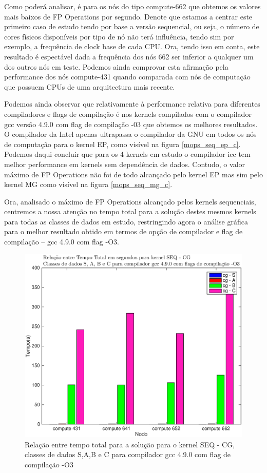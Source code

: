 \documentclass[conference,compsoc]{IEEEtran}
\begin{document}
Como poderá analisar, é para os nós do tipo compute-662 que obtemos os valores mais baixos de FP Operations por segundo. Denote que estamos a centrar este primeiro caso de estudo tendo por base a versão sequencial, ou seja, o número de cores físicos disponíveis por tipo de nó não terá influência, tendo sim por exemplo, a frequência de clock base de cada CPU. Ora, tendo isso em conta, este resultado é espectável dada a frequência dos nós 662 ser inferior a qualquer um dos outros nós em teste. Podemos ainda comprovar esta afirmação pela performance dos nós compute-431 quando comparada com nós de computação que possuem CPUs de uma arquitectura mais recente. \par 
Podemos ainda observar que relativamente à performance relativa para diferentes compiladores e flags de compilação é nos kernels compilados com o compilador gcc versão 4.9.0 com flag de compilação -03 que obtemos os melhores resultados. O compilador da Intel apenas ultrapassa o compilador da GNU em todos os nós de computação para o kernel EP, como visível na figura \ref{mops_seq_ep_c}. Podemos daqui concluir que para os 4 kernels em estudo o compilador icc tem melhor performance em kernels sem dependência de dados. Contudo, o valor máximo de FP Operations não foi de todo alcançado pelo kernel EP mas sim pelo kernel MG como visível na figura \ref{mops_seq_mg_c}.\par 
Ora, analisado o máximo de FP Operations alcançado pelos kernels sequenciais, centremos a nossa atenção no tempo total para a solução destes mesmos kernels para todas as classes de dados em estudo, restringindo agora o análise gráfica para o melhor resultado obtido em termos de opção de compilador e flag de compilação -- gcc 4.9.0 com flag -O3.

\begin{figure}[H]
\centering
\includegraphics[width=1.1\columnwidth]{EPS/SEQ/TEMPO_seq-cg.eps}
\caption{Relação entre tempo total para a solução para o kernel SEQ - CG, classes de dados S,A,B e C para  compilador gcc 4.9.0 com flag de compilação -O3}
\label{tempo_seq_cg_c}
\end{figure}
\end{document}
